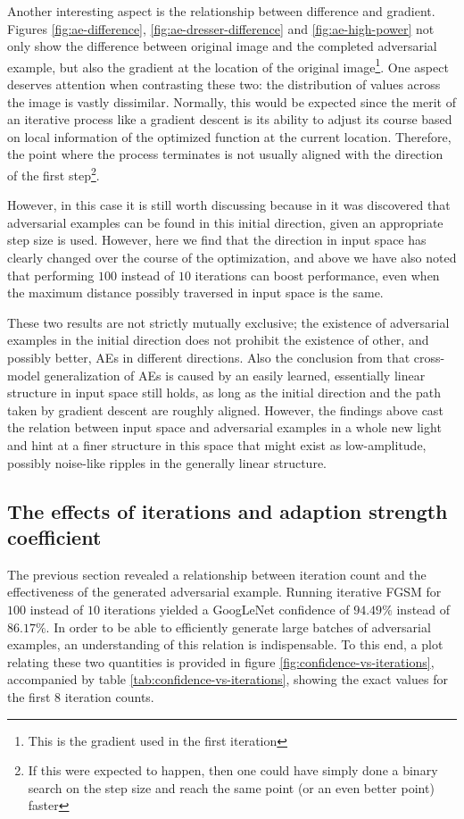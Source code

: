 \documentclass[11pt, a4paper]{article}
\begin{document}
Another interesting aspect is the relationship between difference and gradient. Figures \ref{fig:ae-difference}, \ref{fig:ae-dresser-difference} and \ref{fig:ae-high-power} not only show the difference between original image and the completed adversarial example, but also the gradient at the location of the original image\footnote{This is the gradient used in the first iteration}. One aspect deserves attention when contrasting these two: the distribution of values across the image is vastly dissimilar. Normally, this would be expected since the merit of an iterative process like a gradient descent is its ability to adjust its course based on local information of the optimized function at the current location. Therefore, the point where the process terminates is not usually aligned with the direction of the first step\footnote{If this were expected to happen, then one could have simply done a binary search on the step size and reach the same point (or an even better point) faster}.

However, in this case it is still worth discussing because in \cite{explaining-and-harnessing-adversarial-examples} it was discovered that adversarial examples can be found in this initial direction, given an appropriate step size is used. However, here we find that the direction in input space has clearly changed over the course of the optimization, and above we have also noted that performing $100$ instead of $10$ iterations can boost performance, even when the maximum distance possibly traversed in input space is the same.

These two results are not strictly mutually exclusive; the existence of adversarial examples in the initial direction does not prohibit the existence of other, and possibly better, AEs in different directions. Also the conclusion from \cite{explaining-and-harnessing-adversarial-examples} that cross-model generalization of AEs is caused by an easily learned, essentially linear structure in input space still holds, as long as the initial direction and the path taken by gradient descent are roughly aligned. However, the findings above cast the relation between input space and adversarial examples in a whole new light and hint at a finer structure in this space that might exist as low-amplitude, possibly noise-like ripples in the generally linear structure.

\subsection{The effects of iterations and adaption strength coefficient}
The previous section revealed a relationship between iteration count and the effectiveness of the generated adversarial example. Running iterative FGSM for $100$ instead of $10$ iterations yielded a GoogLeNet confidence of $94.49\%$ instead of $86.17\%$. In order to be able to efficiently generate large batches of adversarial examples, an understanding of this relation is indispensable. To this end, a plot relating these two quantities is provided in figure \ref{fig:confidence-vs-iterations}, accompanied by table \ref{tab:confidence-vs-iterations}, showing the exact values for the first 8 iteration counts.
\end{document}
